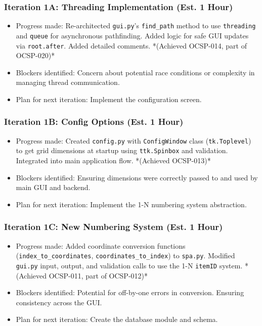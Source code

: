 \subsubsection{Iteration 1A: Threading Implementation (Est. 1 Hour)}
\begin{itemize}
	\item Progress made: Re-architected \verb|gui.py|'s \verb|find_path| method to use \verb|threading| and \verb|queue| for asynchronous pathfinding. Added logic for safe GUI updates via \verb|root.after|. Added detailed comments. *(Achieved OCSP-014, part of OCSP-020)*
	\item Blockers identified: Concern about potential race conditions or complexity in managing thread communication.
	\item Plan for next iteration: Implement the configuration screen.
\end{itemize}

\subsubsection{Iteration 1B: Config Options (Est. 1 Hour)}
\begin{itemize}
	\item Progress made: Created \verb|config.py| with \verb|ConfigWindow| class (\verb|tk.Toplevel|) to get grid dimensions at startup using \verb|ttk.Spinbox| and validation. Integrated into main application flow. *(Achieved OCSP-013)*
	\item Blockers identified: Ensuring dimensions were correctly passed to and used by main GUI and backend.
	\item Plan for next iteration: Implement the 1-N numbering system abstraction.
\end{itemize}

\subsubsection{Iteration 1C: New Numbering System (Est. 1 Hour)}
\begin{itemize}
	\item Progress made: Added coordinate conversion functions (\verb|index_to_coordinates|, \verb|coordinates_to_index|) to \verb|spa.py|. Modified \verb|gui.py| input, output, and validation calls to use the 1-N \verb|itemID| system. *(Achieved OCSP-011, part of OCSP-012)*
	\item Blockers identified: Potential for off-by-one errors in conversion. Ensuring consistency across the GUI.
	\item Plan for next iteration: Create the database module and schema.
\end{itemize}

